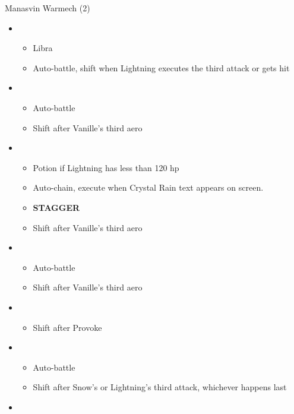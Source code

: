 \begin{multicols}{2}
  \begin{battle}[0:50]{Manasvin Warmech (2)}
    \begin{itemize}
      \item \third
            \begin{itemize}
              \item Libra
              \item Auto-battle, shift when Lightning executes the third attack or gets hit
            \end{itemize}
      \item \fourth
            \begin{itemize}
              \item Auto-battle
              \item Shift after Vanille's third aero
            \end{itemize}
      \item \first
            \begin{itemize}
              \item Potion if Lightning has less than 120 hp
              \item Auto-chain, execute when Crystal Rain text appears on screen.
              \item \textbf{STAGGER}
              \item Shift after Vanille's third aero
            \end{itemize}
      \item \third
            \begin{itemize}
              \item Auto-battle
              \item Shift after Vanille's third aero
            \end{itemize}
      \item \second
            \begin{itemize}
              \item Shift after Provoke
            \end{itemize}
      \item \third
            \begin{itemize}
              \item Auto-battle
              \item Shift after Snow's or Lightning's third attack, whichever happens last
            \end{itemize}
      \item \fourth
            \begin{itemize}

\end{itemize}
\end{itemize}
\end{battle}
\end{multicols}
